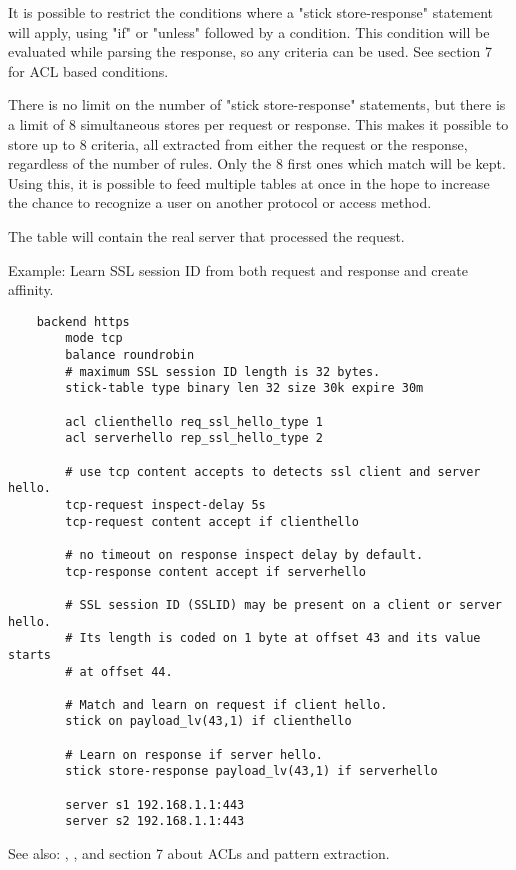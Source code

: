   It is possible to restrict the conditions where a "stick store-response"
  statement will apply, using "if" or "unless" followed by a condition. This
  condition will be evaluated while parsing the response, so any criteria can
  be used. See section 7 for ACL based conditions.

  There is no limit on the number of "stick store-response" statements, but
  there is a limit of 8 simultaneous stores per request or response. This
  makes it possible to store up to 8 criteria, all extracted from either the
  request or the response, regardless of the number of rules. Only the 8 first
  ones which match will be kept. Using this, it is possible to feed multiple
  tables at once in the hope to increase the chance to recognize a user on
  another protocol or access method.

  The table will contain the real server that processed the request.

  Example: Learn SSL session ID from both request and response and create affinity.
  \begin{verbatim}
    backend https
        mode tcp
        balance roundrobin
        # maximum SSL session ID length is 32 bytes.
        stick-table type binary len 32 size 30k expire 30m

        acl clienthello req_ssl_hello_type 1
        acl serverhello rep_ssl_hello_type 2

        # use tcp content accepts to detects ssl client and server hello.
        tcp-request inspect-delay 5s
        tcp-request content accept if clienthello

        # no timeout on response inspect delay by default.
        tcp-response content accept if serverhello

        # SSL session ID (SSLID) may be present on a client or server hello.
        # Its length is coded on 1 byte at offset 43 and its value starts
        # at offset 44.

        # Match and learn on request if client hello.
        stick on payload_lv(43,1) if clienthello

        # Learn on response if server hello.
        stick store-response payload_lv(43,1) if serverhello

        server s1 192.168.1.1:443
        server s2 192.168.1.1:443
  \end{verbatim}

  See also: , , and section 7 about ACLs and pattern
             extraction.


